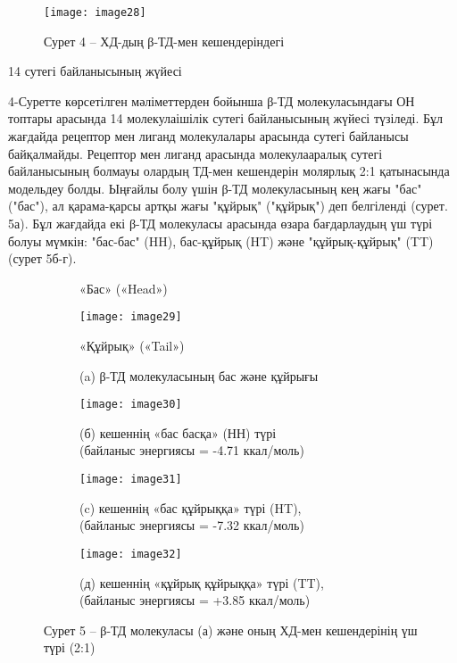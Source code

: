 \begin{figure}[H]
\centering
\texttt{[image: image28]}
\caption*{Сурет 4 -- ХД-дың β-ТД-мен кешендеріндегі}
\end{figure}

\begin{multicols}{2}
14 сутегі байланысының жүйесі

4-Суретте көрсетілген мәліметтерден бойынша β-ТД молекуласындағы ОН
топтары арасында 14 молекулаішілік сутегі байланысының жүйесі түзіледі.
Бұл жағдайда рецептор мен лиганд молекулалары арасында сутегі байланысы
байқалмайды. Рецептор мен лиганд арасында молекулааралық сутегі
байланысының болмауы олардың ТД-мен кешендерін молярлық 2:1 қатынасында
модельдеу болды. Ыңғайлы болу үшін β-ТД молекуласының кең жағы "бас"
("бас"), ал қарама-қарсы артқы жағы "құйрық" ("құйрық") деп белгіленді
(сурет. 5а). Бұл жағдайда екі β-ТД молекуласы арасында өзара
бағдарлаудың үш түрі болуы мүмкін: "бас-бас" (HH), бас-құйрық (HT) және
"құйрық-құйрық" (TT) (сурет 5б-г).
\end{multicols}

\begin{figure}[H]
\centering
\begin{subfigure}[b]{0.4\textwidth}
\centering
\caption*{«Бас» («Head»)}
\texttt{[image: image29]}
\caption*{«Құйрық» («Tail»)}
\caption*{(a) β-ТД молекуласының бас және құйрығы}
\end{subfigure}
\begin{subfigure}[b]{0.4\textwidth}
\centering
\texttt{[image: image30]}
\caption*{(б) кешеннің «бас басқа» (НН) түрі \\
(байланыс энергиясы = -4.71 ккал/моль)}
\end{subfigure}
\begin{subfigure}[b]{0.4\textwidth}
\centering
\texttt{[image: image31]}
\caption*{(c) кешеннің «бас құйрыққа» түрі (HT), \\
(байланыс энергиясы = -7.32 ккал/моль)}
\end{subfigure}
\begin{subfigure}[b]{0.4\textwidth}
\centering
\texttt{[image: image32]}
\caption*{(д) кешеннің «құйрық құйрыққа» түрі (TT), \\
(байланыс энергиясы = +3.85 ккал/моль)}
\end{subfigure}
\caption*{Сурет 5 -- β-ТД молекуласы (а) және оның ХД-мен кешендерінің үш түрі (2:1)}
\end{figure}

